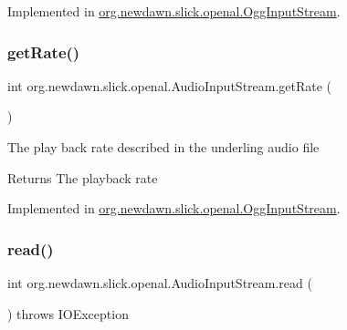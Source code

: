 Implemented in \mbox{\hyperlink{classorg_1_1newdawn_1_1slick_1_1openal_1_1_ogg_input_stream_a63a29d47878503e310d5ea4686751596}{org.\+newdawn.\+slick.\+openal.\+Ogg\+Input\+Stream}}.

\mbox{\label{interfaceorg_1_1newdawn_1_1slick_1_1openal_1_1_audio_input_stream_a461c4ad4304ff8d75693c93e525e0f85}} 
\subsubsection{\texorpdfstring{get\+Rate()}{getRate()}}
{\footnotesize\ttfamily int org.\+newdawn.\+slick.\+openal.\+Audio\+Input\+Stream.\+get\+Rate (\begin{DoxyParamCaption}{ }\end{DoxyParamCaption})}

The play back rate described in the underling audio file

\begin{DoxyReturn}{Returns}
The playback rate 
\end{DoxyReturn}


Implemented in \mbox{\hyperlink{classorg_1_1newdawn_1_1slick_1_1openal_1_1_ogg_input_stream_ae742f942523c3ec33053a494ee3f5050}{org.\+newdawn.\+slick.\+openal.\+Ogg\+Input\+Stream}}.

\mbox{\label{interfaceorg_1_1newdawn_1_1slick_1_1openal_1_1_audio_input_stream_a4e9ee99faa0551bca581a985e262d619}} 
\subsubsection{\texorpdfstring{read()}{read()}\hspace{0.1cm}{\footnotesize\ttfamily [1/3]}}
{\footnotesize\ttfamily int org.\+newdawn.\+slick.\+openal.\+Audio\+Input\+Stream.\+read (\begin{DoxyParamCaption}{ }\end{DoxyParamCaption}) throws I\+O\+Exception}

